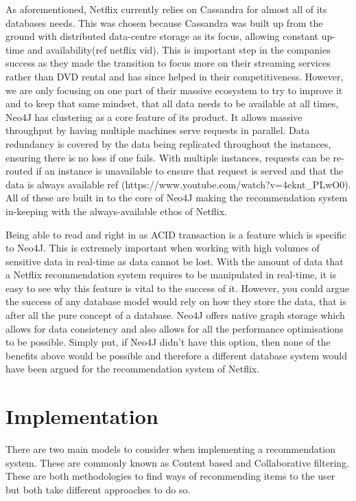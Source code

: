 \documentclass[a4paper]{article}
\begin{document}
As aforementioned, Netflix currently relies on Cassandra for almost all of its databases needs. This was chosen because Cassandra was built up from the ground with distributed data-centre storage as its focus, allowing constant up-time and availability(ref netflix vid). This is important step in the companies success as they made the transition to focus more on their streaming services rather than DVD rental and has since helped in their competitiveness. However, we are only focusing on one part of their massive ecosystem to try to improve it and to keep that same mindset, that all data needs to be available at all times, Neo4J has clustering as a core feature of its product. It allows massive throughput by having multiple machines serve requests in parallel. Data redundancy is covered by the data being replicated throughout the instances, ensuring there is no loss if one fails. With multiple instances, requests can be re-routed if an instance is unavailable to ensure that request is served and that the data is always available ref (https://www.youtube.com/watch?v=4eknt_PLwO0). All of these are built in to the core of Neo4J making the recommendation system in-keeping with the always-available ethos of Netflix. \par

Being able to read and right in as ACID transaction is a feature which is specific to Neo4J. This is extremely important when working with high volumes of sensitive data in real-time as data cannot be lost. With the amount of data that a Netflix recommendation system requires to be manipulated in real-time, it is easy to see why this feature is vital to the success of it. However, you could argue the success of any database model would rely on how they store the data, that is after all the pure concept of a database. Neo4J offers native graph storage which allows for data consistency and also allows for all the performance optimisations to be possible. Simply put, if Neo4J didn't have this option, then none of the benefits above would be possible and therefore a different database system would have been argued for the recommendation system of Netflix.

\section{Implementation}
\label{sec:Implementation}

There are two main models to consider when implementing a recommendation system. These are commonly known as Content based and Collaborative filtering. These are both methodologies to find ways of recommending items to the user but both take different approaches to do so.
\end{document}
